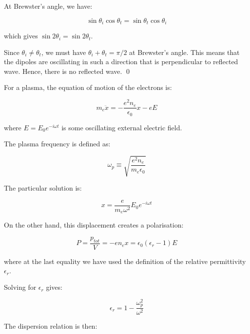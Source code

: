 \documentclass[12pt]{article}
\begin{document}
At Brewster's angle, we have:

\begin{equation}
    \sin{\theta}_{i} \cos{\theta_{t}} = \sin{\theta}_{t} \cos{\theta_{i}}
\end{equation}

which gives $\sin{2\theta_{i}} = \sin{2\theta_{t}}$. 

Since $\theta_{i} \ne \theta_{t}$, we must have $\theta_{i} + \theta_{t} = \pi/2$ at Brewster's angle. This means that the dipoles are oscillating in such a direction that is perpendicular to reflected wave. Hence, there is no reflected wave.
\qed



For a plasma, the equation of motion of the electrons is:

\begin{equation}
    m_{e} \ddot{x} = -\frac{e^{2}n_{e}}{\epsilon_{0}} x - eE
\end{equation}

where $E = E_{0} e^{-i\omega t}$ is some oscillating external electric field.

The plasma frequency is defined as:

\begin{equation}
    \omega_{p} \equiv \sqrt{\frac{e^{2}n_{e}}{m_{e} \epsilon_{0}}}
\end{equation}

The particular solution is:

\begin{equation}
    x = \frac{e}{m_{e} \omega^{2}} E_{0} e^{-i\omega t}
\end{equation}

On the other hand, this displacement creates a polarisation:

\begin{equation}
    P = \frac{p_{tot}}{V} = -e n_{e} x = \epsilon_{0} (\epsilon_{r} - 1) E
\end{equation}

where at the last equality we have used the definition of the relative permittivity $\epsilon_{r}$.

Solving for $\epsilon_{r}$ gives:

\begin{equation}
    \epsilon_{r} = 1 - \frac{\omega_{p}^{2}}{\omega^{2}}
\end{equation}

The dispersion relation is then:
\end{document}
